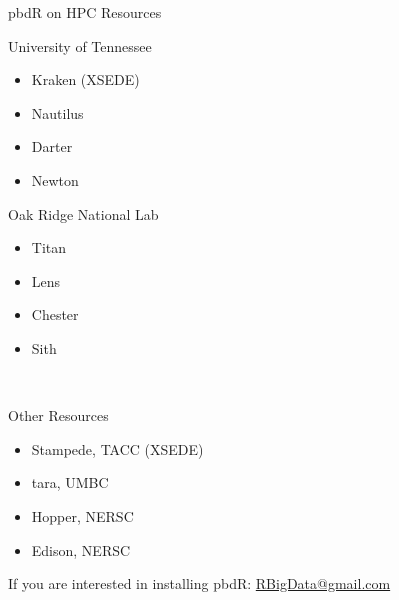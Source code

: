 \begin{frame}
  \begin{block}{pbdR on HPC Resources}
    \begin{minipage}[t]{.575\textwidth}
    University of Tennessee
    \begin{itemize}
      \item Kraken (XSEDE)
      \item Nautilus
      \item Darter
      \item Newton
    \end{itemize}
    \end{minipage}
    \begin{minipage}[t]{.4\textwidth}
    Oak Ridge National Lab
    \begin{itemize}
      \item Titan
      \item Lens
      \item Chester
      \item Sith
    \end{itemize}
    \end{minipage}\\[.4cm]
    \begin{center}
    \hspace{1cm}
    \begin{minipage}{.6\textwidth}
    Other Resources
    \begin{itemize}
    \item Stampede, TACC (XSEDE)
    \item tara, UMBC
    \item Hopper, NERSC
    \item Edison, NERSC
    \end{itemize}
    \end{minipage}
    \end{center}
    \vspace{.2cm}
    If you are interested in installing pbdR:
\url{RBigData@gmail.com}
  \end{block}
\end{frame}





